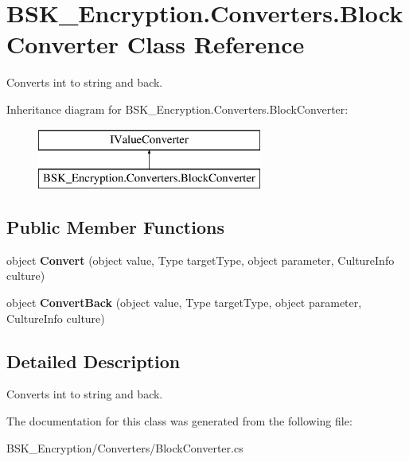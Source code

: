 \hypertarget{class_b_s_k___encryption_1_1_converters_1_1_block_converter}{}\section{B\+S\+K\+\_\+\+Encryption.\+Converters.\+Block\+Converter Class Reference}
\label{class_b_s_k___encryption_1_1_converters_1_1_block_converter}


Converts int to string and back.  


Inheritance diagram for B\+S\+K\+\_\+\+Encryption.\+Converters.\+Block\+Converter\+:\begin{figure}[H]
\begin{center}
\leavevmode
\includegraphics[height=2.000000cm]{class_b_s_k___encryption_1_1_converters_1_1_block_converter}
\end{center}
\end{figure}
\subsection*{Public Member Functions}
\begin{DoxyCompactItemize}
\item 
\mbox{\label{class_b_s_k___encryption_1_1_converters_1_1_block_converter_a542b99e00c81b4a5af2e10bb7a32ae62}} 
object {\bfseries Convert} (object value, Type target\+Type, object parameter, Culture\+Info culture)
\item 
\mbox{\label{class_b_s_k___encryption_1_1_converters_1_1_block_converter_a91fd1d884f9e81865130eabfaf62eebd}} 
object {\bfseries Convert\+Back} (object value, Type target\+Type, object parameter, Culture\+Info culture)
\end{DoxyCompactItemize}


\subsection{Detailed Description}
Converts int to string and back. 



The documentation for this class was generated from the following file\+:\begin{DoxyCompactItemize}
\item 
B\+S\+K\+\_\+\+Encryption/\+Converters/Block\+Converter.\+cs\end{DoxyCompactItemize}
